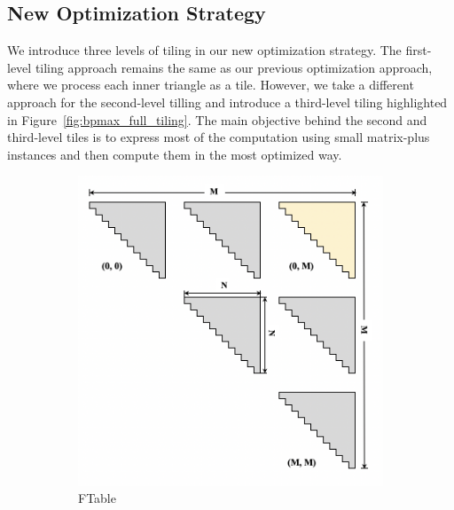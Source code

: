 \subsection{New Optimization Strategy}
We introduce three levels of tiling in our new optimization strategy. The first-level tiling approach remains the same as our previous optimization approach, where we process each inner triangle as a tile. However, we take a different approach for the second-level tilling and introduce a third-level tiling highlighted in Figure~\ref{fig:bpmax_full_tiling}. The main objective behind the second and third-level tiles is to express most of the computation using small matrix-plus instances and then compute them in the most optimized way.

\begin{figure}[htbp]
\centering
    \begin{subfigure}[htbp]{0.22\linewidth}
    \centering
    \includegraphics[scale=0.29, trim=2 2 2 2,clip]{content/figures/tile_0.png}
    \caption{FTable}
    \label{fig:tile_1}
    \end{subfigure}
    \begin{subfigure}[htbp]{0.22\linewidth}
    \centering

\end{subfigure}
\end{figure}
